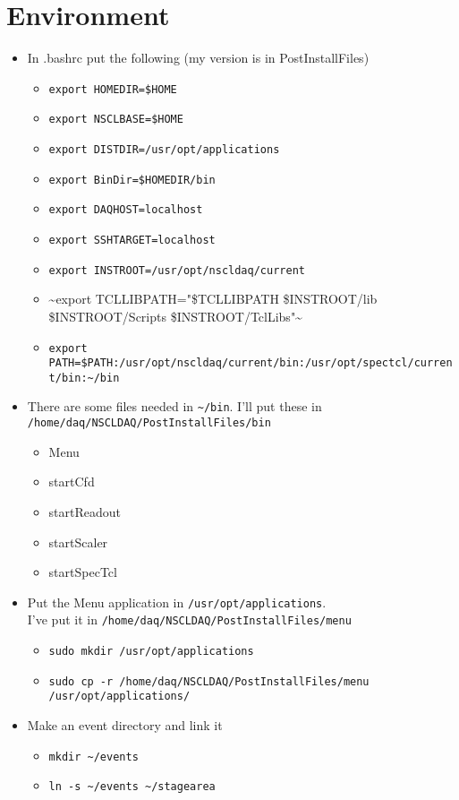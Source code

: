 \documentclass[11pt]{article}
\begin{document}
\section*{Environment}
\label{sec-7}
\begin{itemize}
\item In .bashrc put the following (my version is in PostInstallFiles)
\begin{itemize}
\item \verb~export HOMEDIR=$HOME~
\item \verb~export NSCLBASE=$HOME~
\item \verb~export DISTDIR=/usr/opt/applications~
\item \verb~export BinDir=$HOMEDIR/bin~
\item \verb~export DAQHOST=localhost~
\item \verb~export SSHTARGET=localhost~
\item \verb~export INSTROOT=/usr/opt/nscldaq/current~
\item \textasciitilde{}export TCLLIBPATH="\$TCLLIBPATH \$INSTROOT/lib \$INSTROOT/Scripts \$INSTROOT/TclLibs"\textasciitilde{}
\item \verb,export PATH=$PATH:/usr/opt/nscldaq/current/bin:/usr/opt/spectcl/current/bin:~/bin,
\end{itemize}
\item There are some files needed in \verb,~/bin,. I'll put these in \verb~/home/daq/NSCLDAQ/PostInstallFiles/bin~
\begin{itemize}
\item Menu
\item startCfd
\item startReadout
\item startScaler
\item startSpecTcl
\end{itemize}
\item Put the Menu application in \verb~/usr/opt/applications~.\\
    I've put it in \verb~/home/daq/NSCLDAQ/PostInstallFiles/menu~
\begin{itemize}
\item \verb~sudo mkdir /usr/opt/applications~
\item \verb~sudo cp -r /home/daq/NSCLDAQ/PostInstallFiles/menu /usr/opt/applications/~
\end{itemize}
\item Make an event directory and link it
\begin{itemize}
\item \verb,mkdir ~/events,
\item \verb,ln -s ~/events ~/stagearea,
\end{itemize}
\end{itemize}
\end{document}
